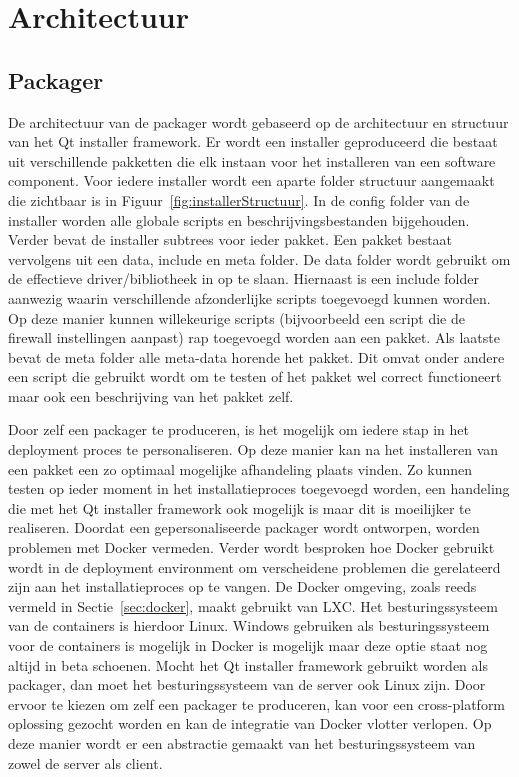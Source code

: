\section{Architectuur}

\subsection{Packager}
De architectuur van de packager wordt gebaseerd op de architectuur en structuur van het Qt installer framework.
Er wordt een installer geproduceerd die bestaat uit verschillende pakketten die elk instaan voor het installeren van een software component.
Voor iedere installer wordt een aparte folder structuur aangemaakt die zichtbaar is in Figuur~\vref{fig:installerStructuur}.
In de config folder van de installer worden alle globale scripts en beschrijvingsbestanden bijgehouden.
Verder bevat de installer subtrees voor ieder pakket.
Een pakket bestaat vervolgens uit een data, include en meta folder.
De data folder wordt gebruikt om de effectieve driver/bibliotheek in op te slaan.
Hiernaast is een include folder aanwezig waarin verschillende afzonderlijke scripts toegevoegd kunnen worden.
Op deze manier kunnen willekeurige scripts (bijvoorbeeld een script die de firewall instellingen aanpast) rap toegevoegd worden aan een pakket.
Als laatste bevat de meta folder alle meta-data horende het pakket.
Dit omvat onder andere een script die gebruikt wordt om te testen of het pakket wel correct functioneert maar ook een beschrijving van het pakket zelf.

Door zelf een packager te produceren, is het mogelijk om iedere stap in het deployment proces te personaliseren.
Op deze manier kan na het installeren van een pakket een zo optimaal mogelijke afhandeling plaats vinden.
Zo kunnen testen op ieder moment in het installatieproces toegevoegd worden, een handeling die met het Qt installer framework ook mogelijk is maar dit is moeilijker te realiseren.
Doordat een gepersonaliseerde packager wordt ontworpen, worden problemen met Docker vermeden.
Verder wordt besproken hoe Docker gebruikt wordt in de deployment environment om verscheidene problemen die gerelateerd zijn aan het installatieproces op te vangen.
De Docker omgeving, zoals reeds vermeld in Sectie~\vref{sec:docker}, maakt gebruikt van LXC.
Het besturingssysteem van de containers is hierdoor Linux.
Windows gebruiken als besturingssysteem voor de containers is mogelijk in Docker is mogelijk maar deze optie staat nog altijd in beta schoenen.
Mocht het Qt installer framework gebruikt worden als packager, dan moet het besturingssysteem van de server ook Linux zijn.
Door ervoor te kiezen om zelf een packager te produceren, kan voor een cross-platform oplossing gezocht worden en kan de integratie van Docker vlotter verlopen.
Op deze manier wordt er een abstractie gemaakt van het besturingssysteem van zowel de server als client.

